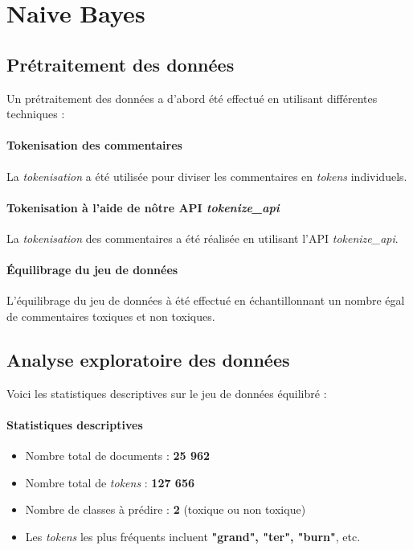 \chapter{Naive Bayes}

\section{Prétraitement des données}

Un prétraitement des données a d'abord été effectué en utilisant différentes techniques :

\subsubsection{Tokenisation des commentaires}

La \textit{tokenisation} a été utilisée pour diviser les commentaires en \textit{tokens} individuels.

\subsubsection*{Tokenisation à l'aide de n\^otre API \textit{tokenize\_api}}

La \textit{tokenisation} des commentaires a été réalisée en utilisant l'API \textit{tokenize\_api}.

\subsubsection*{Équilibrage du jeu de données}

L'équilibrage du jeu de données à été effectué en échantillonnant un nombre égal de commentaires toxiques et non toxiques.

\section{Analyse exploratoire des données}

Voici les statistiques descriptives sur le jeu de données équilibré :

\subsubsection{Statistiques descriptives}

\begin{itemize}
    \item Nombre total de documents : \textbf{25 962}
    \item Nombre total de \textit{tokens} : \textbf{127 656}
    \item Nombre de classes à prédire : \textbf{2} (toxique ou non toxique)
    \item Les \textit{tokens} les plus fréquents incluent \textbf{"grand", "ter", "burn"}, etc.
\end{itemize}

